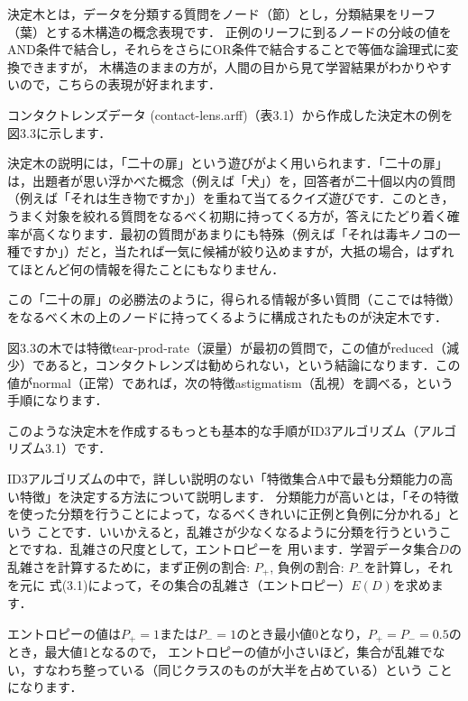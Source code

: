 決定木とは，データを分類する質問をノード（節）とし，分類結果をリーフ（葉）とする木構造の概念表現です．
正例のリーフに到るノードの分岐の値をAND条件で結合し，それらをさらにOR条件で結合することで等価な論理式に変換できますが，
木構造のままの方が，人間の目から見て学習結果がわかりやすいので，こちらの表現が好まれます．

コンタクトレンズデータ (contact-lens.arff)（表3.1）から作成した決定木の例を図3.3に示します．


決定木の説明には，「二十の扉」という遊びがよく用いられます．「二十の扉」は，出題者が思い浮かべた概念（例えば「犬」）を，回答者が二十個以内の質問（例えば「それは生き物ですか」）を重ねて当てるクイズ遊びです．このとき，うまく対象を絞れる質問をなるべく初期に持ってくる方が，答えにたどり着く確率が高くなります．最初の質問があまりにも特殊（例えば「それは毒キノコの一種ですか」）だと，当たれば一気に候補が絞り込めますが，大抵の場合，はずれてほとんど何の情報を得たことにもなりません．

この「二十の扉」の必勝法のように，得られる情報が多い質問（ここでは特徴）をなるべく木の上のノードに持ってくるように構成されたものが決定木です．


図3.3の木では特徴tear-prod-rate（涙量）が最初の質問で，この値がreduced（減少）であると，コンタクトレンズは勧められない，という結論になります．この値がnormal（正常）であれば，次の特徴astigmatism（乱視）を調べる，という手順になります．


このような決定木を作成するもっとも基本的な手順がID3アルゴリズム（アルゴリズム3.1）です．


ID3アルゴリズムの中で，詳しい説明のない「特徴集合A中で最も分類能力の高い特徴」を決定する方法について説明します．
分類能力が高いとは，「その特徴を使った分類を行うことによって，なるべくきれいに正例と負例に分かれる」という
ことです．いいかえると，乱雑さが少なくなるように分類を行うということですね．乱雑さの尺度として，エントロピーを
用います．学習データ集合$D$の乱雑さを計算するために，まず正例の割合: $P_+$,  負例の割合: $P_-$を計算し，それを元に
式(3.1)によって，その集合の乱雑さ（エントロピー）$E(D)$を求めます．

エントロピーの値は$P_+=1$または$P_-=1$のとき最小値0となり，$P_+=P_-=0.5$のとき，最大値1となるので，
エントロピーの値が小さいほど，集合が乱雑でない，すなわち整っている（同じクラスのものが大半を占めている）という
ことになります．

